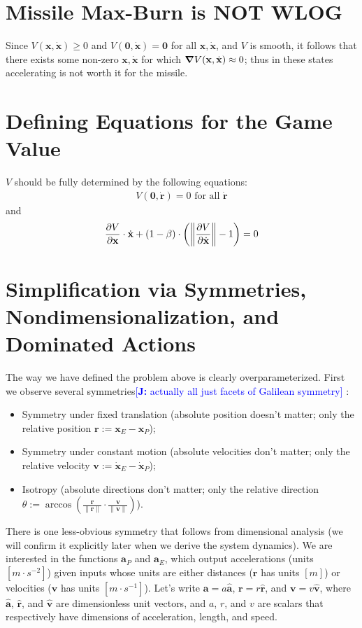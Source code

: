 \documentclass{article}
\newcommand{\authnote}[3]{\textcolor{#3}{[{\footnotesize {\bf #1:} { {#2}}}]}}
\newcommand{\jnote}[1]{\authnote{J}{#1}{blue} }
\newcommand{\eqdef}{:=}
\renewcommand{\vec}[1]{\mathbf{#1}}
\begin{document}
\section{Missile Max-Burn is NOT WLOG}
Since $V(\vec{x}, \dot{\vec{x}}) \ge 0$ and
$V(\vec{0}, \dot{\vec{x}}) = \vec{0}$ for all $\vec{x}, \dot{\vec{x}}$, and $V$
is smooth, it follows that there exists some non-zero $\vec{x}, \dot{\vec{x}}$
for which $\grad V(\vec{x}, \dot{\vec{x}}) \approx 0$; thus in these states
accelerating is not worth it for the missile.


\section{Defining Equations for the Game Value}

$V$ should be fully determined by the following equations:
\begin{align*}
  V(\vec{0}, \dot{\vec{r}}) = 0  \text{ for all $\dot{\vec{r}}$}
\end{align*}
and
\[
  \frac{\partial V}{\partial \vec{x}} \cdot \dot{\vec{x}} + (1 - \beta) \cdot
  \left (\norm{\frac{\partial V}{\partial \dot{\vec{x}}}} - 1 \right) = 0
\]



\section{Simplification via Symmetries, Nondimensionalization, and Dominated Actions}
The way we have defined the problem above is clearly overparameterized.  First
we observe several symmetries\jnote{actually all just facets of Galilean symmetry}:
\begin{itemize}
\item Symmetry under fixed translation (absolute position doesn't matter; only the relative
  position $\vec{r} \eqdef \vec{x}_E - \vec{x}_P$);
\item Symmetry under constant motion (absolute velocities don't matter; only
  the relative velocity $\vec{v} \eqdef \dot{\vec{x}}_E - \dot{\vec{x}}_P$);
\item Isotropy (absolute directions don't matter; only the relative direction
  $\theta \eqdef \arccos(\frac{\vec{r}}{\| \vec{r} \|} \cdot \frac{\vec{v}}{\|
    \vec{v}\|})$).
\end{itemize}

There is one less-obvious symmetry that follows from dimensional analysis (we
will confirm it explicitly later when we derive the system dynamics).  We are
interested in the functions $\vec{a}_P$ and $\vec{a}_E$, which output
accelerations (units $[m \cdot s^{-2}]$) given inputs whose units are either
distances ($\vec{r}$ has units $[m]$) or velocities ($\vec{v}$ has units
$[m \cdot s^{-1}]$).  Let's write $\vec{a} = a \hat{\vec{a}}$,
$\vec{r} = r \hat{\vec{r}}$, and $\vec{v} = v \hat{\vec{v}}$, where $\hat{\vec{a}}$,
$\hat{\vec{r}}$, and $\hat{\vec{v}}$ are dimensionless unit vectors, and $a$, $r$, and $v$ are scalars that respectively have dimensions of
acceleration, length, and speed.
\end{document}
